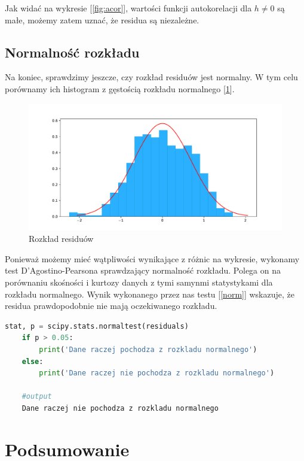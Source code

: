 \documentclass{article}
\theoremstyle{break}
\begin{document}
Jak widać na wykresie [\ref{fig:acor}], wartości funkcji autokorelacji dla $h \neq 0$ są małe, możemy zatem uznać, że residua są niezależne.

\subsection{Normalność rozkładu}

Na koniec, sprawdzimy jeszcze, czy rozkład residuów jest normalny. W tym celu porównamy ich histogram z gęstością rozkładu normalnego [\ref{fig:res_hist}]. 
\begin{figure}[H]
	\begin{center}
		\includegraphics[scale=0.5]{res_hist.pdf}
		\caption{Rozkład residuów}
		\label{fig:res_hist}
	\end{center}
\end{figure}

 Ponieważ możemy mieć wątpliwości wynikające z różnic na wykresie, wykonamy test D'Agostino-Pearsona sprawdzający normalność rozkładu. Polega on na porównaniu skośności i kurtozy danych z tymi samynmi statystykami dla rozkładu normalnego. Wynik wykonanego przez nas testu [\ref{norm}] wskazuje, że residua prawdopodobnie nie mają oczekiwanego rozkładu.


\begin{lstlisting}[language=Python, caption=Test D'Agostino-Pearsona, label={norm}]
	stat, p = scipy.stats.normaltest(residuals)
	if p > 0.05:
		print('Dane raczej pochodza z rozkladu normalnego')
	else:
		print('Dane raczej nie pochodza z rozkladu normalnego')
		
	#output
	Dane raczej nie pochodza z rozkladu normalnego
\end{lstlisting}

	
\section{Podsumowanie}
\end{document}

